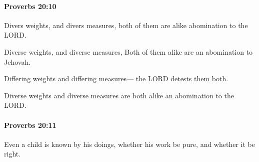 		\paragraph{Proverbs 20:10} %
			\label{PROVERBS-20-10}

			Divers weights, and divers measures, both of them are alike abomination to the LORD.

			\begin{versebox}
					\item[BHS] 
					\item[ASV] Diverse weights, and diverse measures, Both of them alike are an abomination to Jehovah.
					\item[NIV] Differing weights and differing measures— the LORD detests them both.
					\item[NRSV] Diverse weights and diverse measures are both alike an abomination to the LORD.
			\end{versebox}

		\paragraph{Proverbs 20:11} %
			\label{PROVERBS-20-11}

			Even a child is known by his doings, whether his work be pure, and whether it be right.


